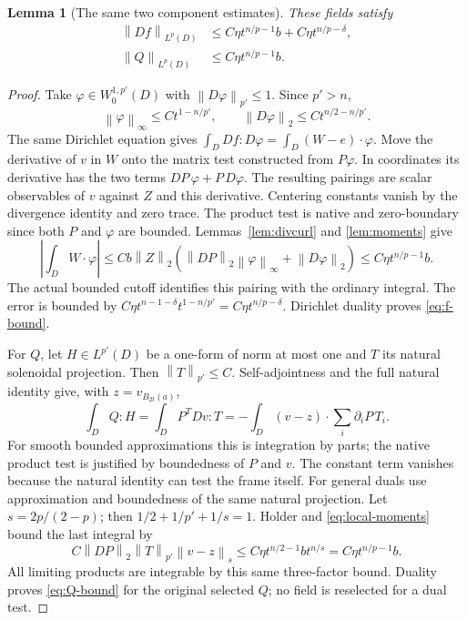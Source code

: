 \documentclass[reqno,11pt]{amsart}
\numberwithin{equation}{section}
\newtheorem{lemma}[theorem]{Lemma}
\theoremstyle{definition}
\theoremstyle{remark}
\newcommand{\norm}[1]{\left\lVert#1\right\rVert}
\begin{document}
\begin{lemma}[The same two component estimates]\label{lem:field-bounds}
These fields satisfy
\begin{align}
 \norm{Df}_{L^p(D)}&\leq C\eta t^{n/p-1}b+C\eta t^{n/p-\delta},
                                                   \label{eq:f-bound}\\
 \norm Q_{L^p(D)}&\leq C\eta t^{n/p-1}b.\label{eq:Q-bound}
\end{align}
\end{lemma}
\begin{proof}
Take $\varphi\in W^{1,p'}_0(D)$ with $\norm{D\varphi}_{p'}\leq1$.
Since $p'>n$,
\begin{equation}\label{eq:test-scaling}
 \norm\varphi_\infty\leq Ct^{1-n/p'},\qquad
 \norm{D\varphi}_2\leq Ct^{n/2-n/p'}.
\end{equation}
The same Dirichlet equation gives
$\int_D Df:D\varphi=\int_D(W-e)\cdot\varphi$.
Move the derivative of $v$ in $W$ onto the matrix test constructed
from $P\varphi$. In coordinates its derivative has the two terms
$DP\,\varphi+P\,D\varphi$. The resulting pairings are scalar
observables of $v$ against $Z$ and this derivative. Centering constants
vanish by the divergence identity and zero trace. The product test is
native and zero-boundary since both $P$ and $\varphi$ are bounded.
Lemmas~\ref{lem:divcurl} and \ref{lem:moments} give
\[
 \left|\int_D W\cdot\varphi\right|
 \leq Cb\norm Z_2
       (\norm{DP}_2\norm\varphi_\infty+\norm{D\varphi}_2)
 \leq C\eta t^{n/p-1}b.
\]
The actual bounded cutoff identifies this pairing with the ordinary
integral. The error is bounded by
$C\eta t^{n-1-\delta}t^{1-n/p'}=C\eta t^{n/p-\delta}$.
Dirichlet duality proves \eqref{eq:f-bound}.

For $Q$, let $H\in L^{p'}(D)$ be a one-form of norm at most one and
$T$ its natural solenoidal projection. Then
$\norm T_{p'}\leq C$. Self-adjointness and the full natural identity
give, with $z=v_{B_{2t}(a)}$,
\begin{equation}\label{eq:Q-dual}
 \int_D Q:H=\int_D P^TDv:T
          =-\int_D (v-z)\cdot\sum_i\partial_iP\,T_i.
\end{equation}
For smooth bounded approximations this is integration by parts; the
native product test is justified by boundedness of $P$ and $v$.
The constant term vanishes because the natural identity can test the
frame itself. For general duals use approximation and boundedness of
the same natural projection.
Let $s=2p/(2-p)$; then $1/2+1/p'+1/s=1$. Holder and
\eqref{eq:local-moments} bound the last integral by
\[
 C\norm{DP}_2\norm T_{p'}\norm{v-z}_s
 \leq C\eta t^{n/2-1}bt^{n/s}
 =C\eta t^{n/p-1}b.
\]
All limiting products are integrable by this same three-factor bound.
Duality proves \eqref{eq:Q-bound} for the original selected $Q$;
no field is reselected for a dual test.
\end{proof}
\end{document}
